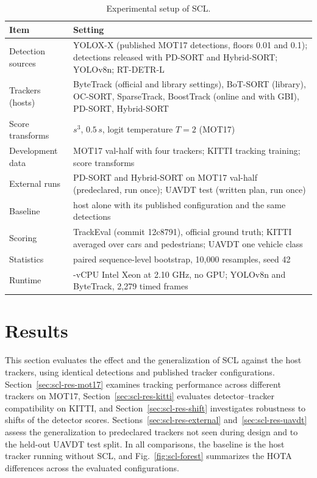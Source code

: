 \begin{table}[tbp]
\centering
\caption{Experimental setup of SCL.}
\label{tab:scl-setup}
\begin{tabular}{>{\raggedright\arraybackslash}p{3.2cm}>{\raggedright\arraybackslash}p{11.2cm}}
\toprule
Item & Setting\\
\midrule
Detection sources & YOLOX-X (published MOT17 detections, floors 0.01 and 0.1); detections released with PD-SORT and Hybrid-SORT; YOLOv8n; RT-DETR-L\\
Trackers (hosts) & ByteTrack (official and library settings), BoT-SORT (library), OC-SORT, SparseTrack, BoostTrack (online and with GBI), PD-SORT, Hybrid-SORT\\
Score transforms & $s^3$, $0.5\,s$, logit temperature $T=2$ (MOT17)\\
Development data & MOT17 val-half with four trackers; KITTI tracking training; score transforms\\
External runs & PD-SORT and Hybrid-SORT on MOT17 val-half (predeclared, run once); UAVDT test (written plan, run once)\\
Baseline & host alone with its published configuration and the same detections\\
Scoring & TrackEval (commit 12c8791), official ground truth; KITTI averaged over cars and pedestrians; UAVDT one vehicle class\\
Statistics & paired sequence-level bootstrap, 10,000 resamples, seed 42\\
Runtime & 4-vCPU Intel Xeon at 2.10 GHz, no GPU; YOLOv8n and ByteTrack, 2,279 timed frames\\
\bottomrule
\end{tabular}
\end{table}

\section{Results}\label{sec:scl-results}
This section evaluates the effect and the generalization of SCL against the host trackers, using identical detections and published tracker configurations. Section~\ref{sec:scl-res-mot17} examines tracking performance across different trackers on MOT17, Section~\ref{sec:scl-res-kitti} evaluates detector--tracker compatibility on KITTI, and Section~\ref{sec:scl-res-shift} investigates robustness to shifts of the detector scores. Sections~\ref{sec:scl-res-external} and~\ref{sec:scl-res-uavdt} assess the generalization to predeclared trackers not seen during design and to the held-out UAVDT test split. In all comparisons, the baseline is the host tracker running without SCL, and Fig.~\ref{fig:scl-forest} summarizes the HOTA differences across the evaluated configurations.

